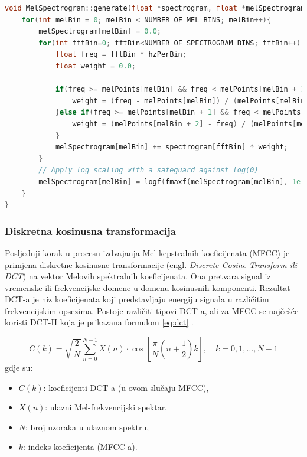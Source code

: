 \newpage

\begin{lstlisting}[language=C++, caption=Generiranje Melovog spektrograma, label=code:mel]
void MelSpectrogram::generate(float *spectrogram, float *melSpectrogram){
    for(int melBin = 0; melBin < NUMBER_OF_MEL_BINS; melBin++){
        melSpectrogram[melBin] = 0.0;
        for(int fftBin=0; fftBin<NUMBER_OF_SPECTROGRAM_BINS; fftBin++){
            float freq = fftBin * hzPerBin;
            float weight = 0.0;

            if(freq >= melPoints[melBin] && freq < melPoints[melBin + 1]){
                weight = (freq - melPoints[melBin]) / (melPoints[melBin + 1] - melPoints[melBin]);
            }else if(freq >= melPoints[melBin + 1] && freq < melPoints[melBin + 2]){
                weight = (melPoints[melBin + 2] - freq) / (melPoints[melBin + 2] - melPoints[melBin + 1]);
            }
            melSpectrogram[melBin] += spectrogram[fftBin] * weight;
        }
        // Apply log scaling with a safeguard against log(0)
        melSpectrogram[melBin] = logf(fmaxf(melSpectrogram[melBin], 1e-6));
    }
}
\end{lstlisting}

\subsubsection{Diskretna kosinusna transformacija}

Posljednji korak u procesu izdvajanja Mel-kepstralnih koeficijenata (MFCC) je primjena diskretne
kosinusne transformacije (engl. \textit{Discrete Cosine Transform ili DCT}) na vektor Melovih spektralnih
koeficijenata. Ona pretvara signal iz vremenske ili frekvencijske domene u 
domenu kosinusnih komponenti. Rezultat DCT-a je niz koeficijenata koji predstavljaju energiju 
signala u različitim frekvencijskim opsezima. 
Postoje različiti tipovi DCT-a, ali za MFCC se najčešće koristi DCT-II koja je prikazana
formulom \eqref{eq:dct} .

\begin{equation}
    \label{eq:dct}
    C(k) = \sqrt{\frac{2}{N}} \sum_{n=0}^{N-1} X(n) \cdot \cos\left[ \frac{\pi}{N} \left(n + \frac{1}{2}\right) k \right], \quad k = 0, 1, \dots, N-1
\end{equation}
gdje su:
\begin{itemize}
\item $C(k)$: koeficijenti DCT-a (u ovom slučaju MFCC),
\item $X(n)$: ulazni Mel-frekvencijski spektar,
\item $N$: broj uzoraka u ulaznom spektru,
\item $k$: indeks koeficijenta (MFCC-a).
\end{itemize}

